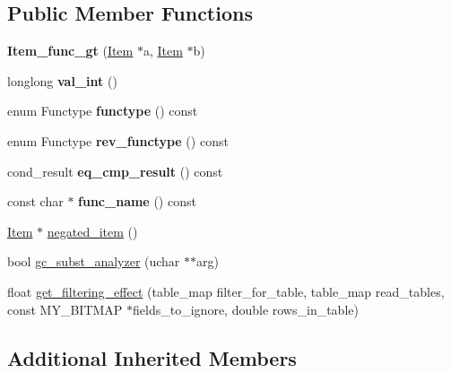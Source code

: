 \subsection*{Public Member Functions}
\begin{DoxyCompactItemize}
\item 
\mbox{\label{classItem__func__gt_a632e73fab70e01c94778aa267b352fa7}} 
{\bfseries Item\+\_\+func\+\_\+gt} (\mbox{\hyperlink{classItem}{Item}} $\ast$a, \mbox{\hyperlink{classItem}{Item}} $\ast$b)
\item 
\mbox{\label{classItem__func__gt_a8b8dd5a5bff18bd295184d47518d0893}} 
longlong {\bfseries val\+\_\+int} ()
\item 
\mbox{\label{classItem__func__gt_a2eba0ef226c6e0fde4a3e9ad395b9e4a}} 
enum Functype {\bfseries functype} () const
\item 
\mbox{\label{classItem__func__gt_af566c2c8cd6dd13f3f49357cc6dc6bf7}} 
enum Functype {\bfseries rev\+\_\+functype} () const
\item 
\mbox{\label{classItem__func__gt_a91f19c7a177ca4934c4f598e83001379}} 
cond\+\_\+result {\bfseries eq\+\_\+cmp\+\_\+result} () const
\item 
\mbox{\label{classItem__func__gt_ae8415c284f58fff19620870bbe49df67}} 
const char $\ast$ {\bfseries func\+\_\+name} () const
\item 
\mbox{\hyperlink{classItem}{Item}} $\ast$ \mbox{\hyperlink{classItem__func__gt_ab45dc92cd853e77400c6bc11626fba33}{negated\+\_\+item}} ()
\item 
bool \mbox{\hyperlink{classItem__func__gt_a1b58f75ad3398ed88cf619f1d54109a8}{gc\+\_\+subst\+\_\+analyzer}} (uchar $\ast$$\ast$arg)
\item 
float \mbox{\hyperlink{classItem__func__gt_a01c0dea29d81f8f99c9a856381c20351}{get\+\_\+filtering\+\_\+effect}} (table\+\_\+map filter\+\_\+for\+\_\+table, table\+\_\+map read\+\_\+tables, const M\+Y\+\_\+\+B\+I\+T\+M\+AP $\ast$fields\+\_\+to\+\_\+ignore, double rows\+\_\+in\+\_\+table)
\end{DoxyCompactItemize}
\subsection*{Additional Inherited Members}



